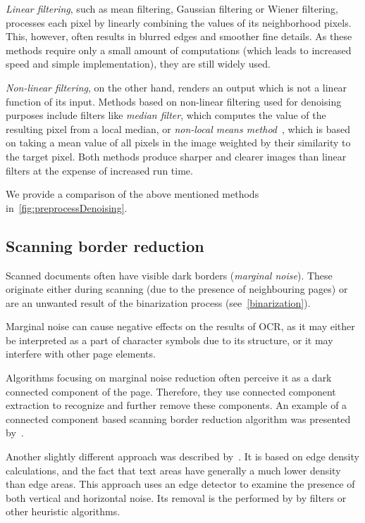 \emph{Linear filtering}, such as mean filtering, Gaussian filtering or Wiener filtering, processes each pixel by linearly combining the values of its neighborhood pixels. This, however, often results in blurred edges and smoother fine details. As these methods require only a small amount of computations (which leads to increased speed and simple implementation), they are still widely used.

\emph{Non-linear filtering}, on the other hand, renders an output which is not a linear function of its input. Methods based on non-linear filtering used for denoising purposes include filters like \emph{median filter}, which computes the value of the resulting pixel from a local median, or \emph{non-local means method}~\citep{nonLocalMeans}, which is based on taking a mean value of all pixels in the image weighted by their similarity to the target pixel. Both methods produce sharper and clearer images than linear filters at the expense of increased run time.

We provide a comparison of the above mentioned methods in~\cref{fig:preprocessDenoising}.

\subsection{Scanning border reduction}

Scanned documents often have visible dark borders (\emph{marginal noise}). These originate either during scanning (due to the presence of neighbouring pages) or are an unwanted result of the binarization process (see~\cref{binarization}). 

Marginal noise can cause negative effects on the results of OCR, as it may either be interpreted as a part of character symbols due to its structure, or it may interfere with other page elements.

Algorithms focusing on marginal noise reduction often perceive it as a dark connected component of the page. Therefore, they use connected component extraction to recognize and further remove these components. An example of a connected component based scanning border reduction algorithm was presented by~\citet{marginalNoiseWindow}.

Another slightly different approach was described by~\citet{marginalNoiseEdge}. It is based on edge density calculations, and the fact that text areas have generally a much lower density than edge areas. This approach uses an edge detector to examine the presence of both vertical and horizontal noise. Its removal is the performed by by filters or other heuristic algorithms.


